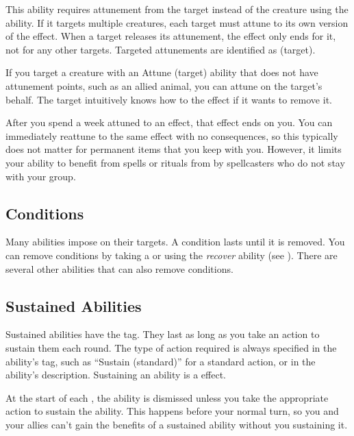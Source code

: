      This ability requires attunement from the target instead of the creature using the ability.
    If it targets multiple creatures, each target must attune to its own version of the effect.
    When a target releases its attunement, the effect only ends for it, not for any other targets.
    Targeted attunements are identified as  (target).

    If you target a creature with an Attune (target) ability that does not have attunement points, such as an allied animal, you can attune on the target's behalf.
    The target intuitively knows how to  the effect if it wants to remove it.

     After you spend a week attuned to an effect, that effect ends on you.
    You can immediately reattune to the same effect with no consequences, so this typically does not matter for permanent items that you keep with you.
    However, it limits your ability to benefit from spells or rituals from by spellcasters who do not stay with your group.

  \subsection{Conditions}\label{Conditions}
    Many abilities impose  on their targets.
    A condition lasts until it is removed.
    You can remove conditions by taking a  or using the \textit{recover} ability (see ).
    There are several other abilities that can also remove conditions.

  \subsection{Sustained Abilities}\label{Sustained Abilities}
    Sustained abilities have the  tag.
    They last as long as you take an action to sustain them each round.
    The type of action required is always specified in the ability's tag, such as ``Sustain (standard)'' for a standard action, or in the ability's description.
    Sustaining an ability is a \atSwift effect.

    At the start of each , the ability is dismissed unless you take the appropriate action to sustain the ability.
    This happens before your normal turn, so you and your allies can't gain the benefits of a sustained ability without you sustaining it.

